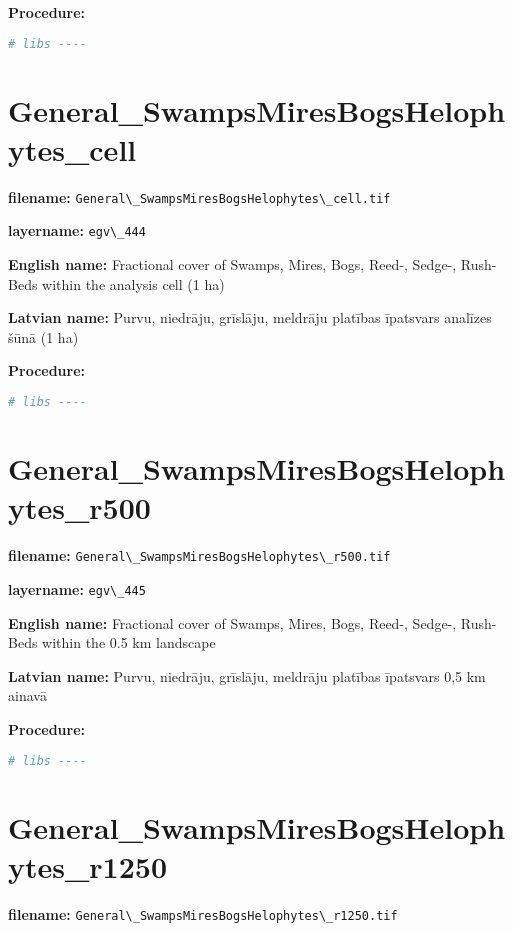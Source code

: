 \documentclass[
]{book}
\newcommand{\passthrough}[1]{#1}
\begin{document}
\textbf{Procedure:}

\begin{lstlisting}[language=R]
# libs ----
\end{lstlisting}

\section{General\_SwampsMiresBogsHelophytes\_cell}\label{ch06.444}

\textbf{filename:} \passthrough{\lstinline!General\_SwampsMiresBogsHelophytes\_cell.tif!}

\textbf{layername:} \passthrough{\lstinline!egv\_444!}

\textbf{English name:} Fractional cover of Swamps, Mires, Bogs, Reed-, Sedge-, Rush- Beds within the analysis cell (1 ha)

\textbf{Latvian name:} Purvu, niedrāju, grīslāju, meldrāju platības īpatsvars analīzes šūnā (1 ha)

\textbf{Procedure:}

\begin{lstlisting}[language=R]
# libs ----
\end{lstlisting}

\section{General\_SwampsMiresBogsHelophytes\_r500}\label{ch06.445}

\textbf{filename:} \passthrough{\lstinline!General\_SwampsMiresBogsHelophytes\_r500.tif!}

\textbf{layername:} \passthrough{\lstinline!egv\_445!}

\textbf{English name:} Fractional cover of Swamps, Mires, Bogs, Reed-, Sedge-, Rush- Beds within the 0.5 km landscape

\textbf{Latvian name:} Purvu, niedrāju, grīslāju, meldrāju platības īpatsvars 0,5 km ainavā

\textbf{Procedure:}

\begin{lstlisting}[language=R]
# libs ----
\end{lstlisting}

\section{General\_SwampsMiresBogsHelophytes\_r1250}\label{ch06.446}

\textbf{filename:} \passthrough{\lstinline!General\_SwampsMiresBogsHelophytes\_r1250.tif!}
\end{document}

